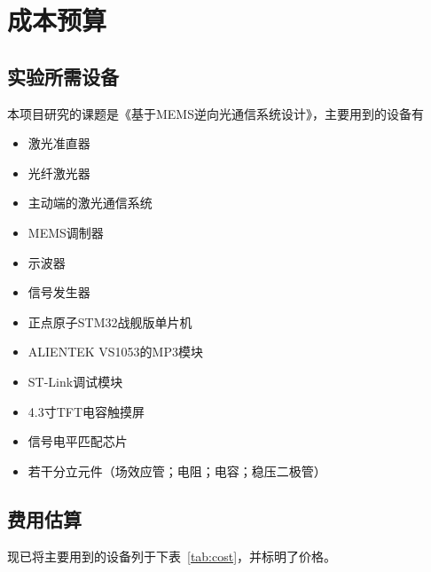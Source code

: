 \chapter{成本预算}

\section{实验所需设备}
本项目研究的课题是《基于MEMS逆向光通信系统设计》，主要用到的设备有
\begin{itemize}
	\item 激光准直器
	\item 光纤激光器
	\item 主动端的激光通信系统
	\item MEMS调制器
	\item 示波器
	\item 信号发生器
	\item 正点原子STM32战舰版单片机
	\item  ALIENTEK VS1053的MP3模块
	\item ST-Link调试模块
	\item 4.3寸TFT电容触摸屏
	\item 信号电平匹配芯片
	\item 若干分立元件（场效应管；电阻；电容；稳压二极管）
\end{itemize}

\section{费用估算}
现已将主要用到的设备列于下表~\ref{tab:cost}，并标明了价格。

